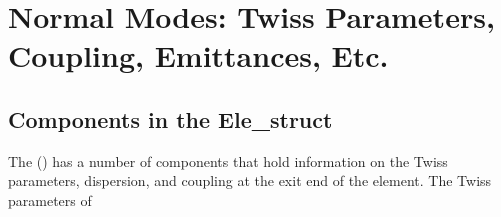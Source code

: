 \chapter{Normal Modes: Twiss Parameters, Coupling, Emittances, Etc.}
\label{c:normal.modes}

\section{Components in the Ele\_struct}
\label{s:twiss.ele}

The  () has a number of components that hold information on the
Twiss parameters, dispersion, and coupling at the exit end of the element. The Twiss parameters of
